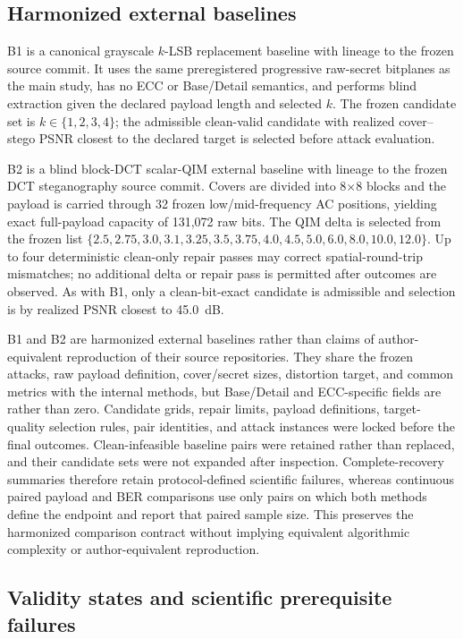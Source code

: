 \subsection{Harmonized external baselines}

B1 is a canonical grayscale $k$-LSB replacement baseline with lineage to the frozen  source commit. It uses the same preregistered progressive raw-secret bitplanes as the main study, has no ECC or Base/Detail semantics, and performs blind extraction given the declared payload length and selected $k$. The frozen candidate set is $k\in\{1,2,3,4\}$; the admissible clean-valid candidate with realized cover--stego PSNR closest to the declared target is selected before attack evaluation.

B2 is a blind block-DCT scalar-QIM external baseline with lineage to the frozen DCT steganography source commit. Covers are divided into 8$\times$8 blocks and the payload is carried through 32 frozen low/mid-frequency AC positions, yielding exact full-payload capacity of 131,072 raw bits. The QIM delta is selected from the frozen list \(\{2.5,2.75,3.0,3.1,3.25,3.5,3.75,4.0,4.5,5.0,6.0,8.0,10.0,12.0\}\). Up to four deterministic clean-only repair passes may correct spatial-round-trip mismatches; no additional delta or repair pass is permitted after outcomes are observed. As with B1, only a clean-bit-exact candidate is admissible and selection is by realized PSNR closest to 45.0~dB.

B1 and B2 are harmonized external baselines rather than claims of author-equivalent reproduction of their source repositories. They share the frozen attacks, raw payload definition, cover/secret sizes, distortion target, and common metrics with the internal methods, but Base/Detail and ECC-specific fields are  rather than zero. Candidate grids, repair limits, payload definitions, target-quality selection rules, pair identities, and attack instances were locked before the final outcomes. Clean-infeasible baseline pairs were retained rather than replaced, and their candidate sets were not expanded after inspection. Complete-recovery summaries therefore retain protocol-defined scientific failures, whereas continuous paired payload and BER comparisons use only pairs on which both methods define the endpoint and report that paired sample size. This preserves the harmonized comparison contract without implying equivalent algorithmic complexity or author-equivalent reproduction.

\subsection{Validity states and scientific prerequisite failures}

